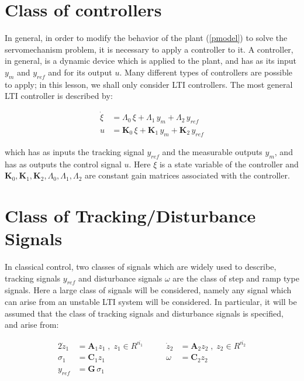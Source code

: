 \documentclass[a4paper,11pt]{article} %
\theoremstyle{plain} %
{\theorembodyfont{\normalfont}
\newtheorem{Exa}{Example}}
\newcommand{\matr}[1]{\mathbf{#1}}
\begin{document}
\section{Class of controllers}
In general, in order to modify the behavior of the plant (\ref{pmodel}) to solve the servomechanism problem, it is necessary to apply a controller to it. A controller, in general, is a dynamic device which is applied to the plant, and has as its input $y_m$ and $y_{ref}$ and for its output $u$. Many different
types of controllers are possible to apply; in this lesson, we shall only consider LTI controllers. The most general LTI controller is described by:

\begin{align}\label{class-ctr}
 \dot{\xi} &= {\Lambda}_0 \,\xi + {\Lambda}_1 \, y_m + {\Lambda}_2
 \, y_{ref} \\
 u &= \matr{K}_0 \,\xi + \matr{K}_1 \, y_m + \matr{K}_2 \, y_{ref} \nonumber
\end{align}

which has as inputs the tracking signal $y_{ref}$ and the measurable outputs $y_m$, and has as outputs the control signal $u$. Here $\xi$ is a state variable of the controller and $\matr{K}_0, \matr{K}_1, \matr{K}_2, \Lambda_0, \Lambda_1, \Lambda_2$ are constant gain matrices associated with the controller.

\section{Class of Tracking/Disturbance Signals}
In classical control, two classes of signals which are widely used
to describe, tracking signals $y_{ref}$ and disturbance signals
$\omega$ are the class of step and ramp type signals. Here a large
class of signals will be considered, namely any signal which can
arise from an unstable LTI system will be considered. In
particular, it will be assumed that the class of tracking signals
and disturbance signals is specified, and arise from:

\begin{alignat}{2}\label{class-tds}
\dot{z}_1 &= \matr{A}_1 z_1 \;,\; z_1 \in R^{\overline{n_1}} &\qquad %
\dot{z}_2 &= \matr{A}_2 z_2 \;,\; z_2 \in R^{\overline{n_2}} \nonumber \\%
\sigma_1 &= \matr{C}_1 z_1  &\qquad \omega &= \matr{C}_2 z_2 \\%
y_{ref} &= \matr{G} \, \sigma_1 \nonumber %
\end{alignat}
\end{document}
